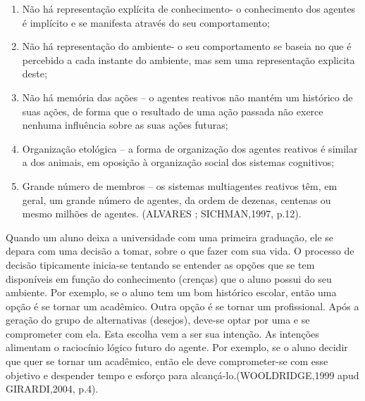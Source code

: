 \begin{citacao}
\begin{enumerate}

	\item Não há representação explícita de conhecimento- o conhecimento dos agentes é implícito e se manifesta através do seu comportamento;

	\item Não há representação do ambiente- o seu comportamento se baseia no que é percebido a cada instante do ambiente, mas sem uma representação explicita deste; 

	\item Não há memória das ações – o agentes reativos não mantém um histórico de suas ações, de forma que o resultado de uma ação passada não exerce nenhuma influência sobre as suas ações futuras;


	\item Organização etológica – a forma de organização dos agentes reativos é similar a dos animais, em oposição à organização social dos sistemas cognitivos;

 	\item Grande número de membros – os sistemas multiagentes reativos têm, em geral, um grande número de agentes, da ordem de dezenas, centenas ou mesmo milhões de agentes. (ALVARES ; SICHMAN,1997, p.12).

\end{enumerate}
\end{citacao}



Quando um aluno deixa a universidade com uma primeira graduação, ele se depara com uma decisão a tomar, sobre o que fazer com sua vida. O processo de decisão tipicamente inicia-se tentando se entender as opções que se tem disponíveis em função do conhecimento (crenças) que o aluno possui do seu ambiente. Por exemplo, se o aluno tem um bom histórico escolar, então uma opção é se tornar um acadêmico. Outra opção é se tornar um profissional. Após a geração do grupo de alternativas (desejos), deve-se optar por uma e se comprometer com ela. Esta escolha vem a ser sua intenção. As intenções alimentam o raciocínio lógico futuro do agente. Por exemplo, se o aluno decidir que quer se tornar um acadêmico, então ele deve comprometer-se com esse objetivo e despender tempo e esforço para alcançá-lo.(WOOLDRIDGE,1999 apud GIRARDI,2004, p.4).

